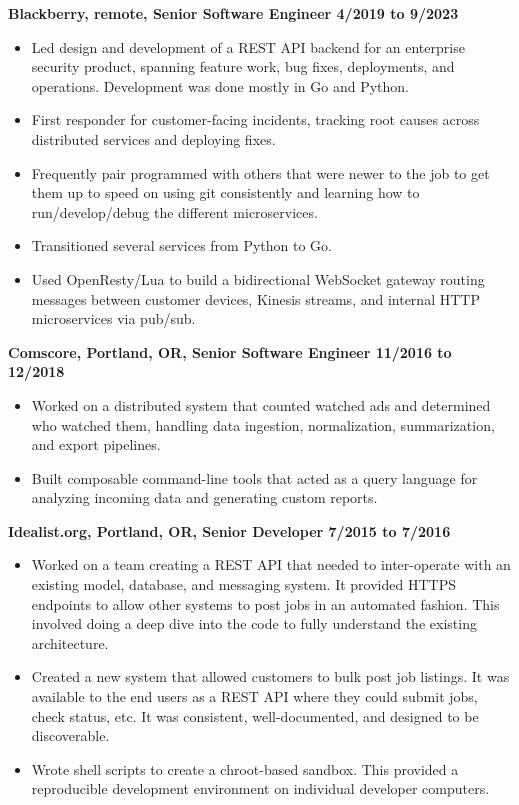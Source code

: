 \documentclass{res}
\begin{document}
\begin{resume}
  {\large \bf Blackberry, remote, Senior Software Engineer \hfill 4/2019 to 9/2023}
  \begin{itemize}
  \item
    Led design and development of a REST API backend for an enterprise
    security product, spanning feature work, bug fixes, deployments, and
    operations.  Development was done mostly in Go and Python.
  \item
    First responder for customer-facing incidents, tracking root causes
    across distributed services and deploying fixes.
  \item
    Frequently pair programmed with others that were newer to the job
    to get them up to speed on using git consistently and learning how
    to run/develop/debug the different microservices.
  \item
    Transitioned several services from Python to Go.
  \item
    Used OpenResty/Lua to build a bidirectional WebSocket gateway routing messages between customer devices, Kinesis streams, and internal HTTP microservices via pub/sub.
  \end{itemize}

  {\large \bf Comscore, Portland, OR, Senior Software Engineer \hfill 11/2016 to 12/2018}
  \begin{itemize}
  \item
    Worked on a distributed system that counted watched ads and determined
    who watched them, handling data ingestion, normalization, summarization,
    and export pipelines.
  \item
    Built composable command-line tools that acted as a query language for
    analyzing incoming data and generating custom reports.
  \end{itemize}

  {\large \bf Idealist.org, Portland, OR, Senior Developer \hfill 7/2015 to 7/2016}
  \begin{itemize}
    \item
    Worked on a team creating a REST API that needed
    to inter-operate with an existing model, database, and messaging
    system. It provided HTTPS endpoints to allow other systems to post
    jobs in an automated fashion.  This involved doing a deep dive into
    the code to fully understand the existing architecture.
    \item
    Created a new system that allowed
    customers to bulk post job listings.  It was available to the end users
    as a REST API where they could submit jobs, check status, etc.
    It was consistent, well-documented, and designed to be discoverable.
    \item
    Wrote shell scripts to create a chroot-based sandbox.  This provided
    a reproducible development environment on individual developer
    computers.
  \end{itemize}


\end{resume}
\end{document}
